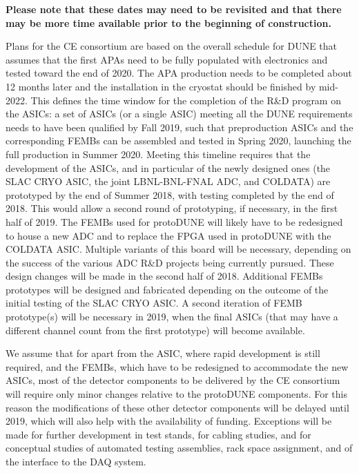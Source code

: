 {\bf Please note that these dates may need to be revisited and that there
may be more time available prior to the beginning of construction.}

Plans for the CE consortium are based on the overall schedule for DUNE
that assumes that the first APAs need to be fully populated with electronics
and tested toward the end of 2020. The APA production needs to be completed
about 12 months later and the installation in the cryostat should be
finished by mid-2022. This defines the time window for the completion of
the R\&D program on the ASICs: a set of ASICs (or a single ASIC) meeting
all the DUNE requirements needs to have been qualified by Fall 2019, such
that preproduction ASICs and the corresponding FEMBs can be assembled and
tested in Spring 2020, launching the full production in Summer 2020. Meeting
this timeline requires that the development of the ASICs, and in particular
of the newly designed ones (the SLAC CRYO ASIC, the joint LBNL-BNL-FNAL ADC,
and COLDATA) are prototyped by the end of Summer 2018, with testing
completed by the end of 2018. This would allow a second round of prototyping,
if necessary, in the first half of 2019. The FEMBs used for protoDUNE will
likely have to be redesigned to house a new ADC and to replace the FPGA used
in protoDUNE with the COLDATA ASIC. Multiple variants of this board will be
necessary, depending on the success of the various ADC R\&D projects being currently
pursued. These design changes will be made in the second half of 2018.
Additional FEMBs prototypes will be designed and fabricated depending on
the outcome of the initial testing of the SLAC CRYO ASIC. A second iteration
of FEMB prototype(s) will be necessary in 2019, when the final ASICs (that
may have a different channel count from the first prototype) will become
available.

We assume that for apart from the ASIC, where rapid development is still
required, and the FEMBs, which have to be redesigned to accommodate the
new ASICs, most of the detector components to be delivered by the CE consortium
will require only minor changes relative to the protoDUNE components. For
this reason the modifications of these other detector components will
be delayed until 2019, which will also help with the availability of funding.
Exceptions will be made for further development in test stands, for cabling
studies, and for conceptual studies of automated testing assemblies, rack space
assignment, and of the interface to the DAQ system.

